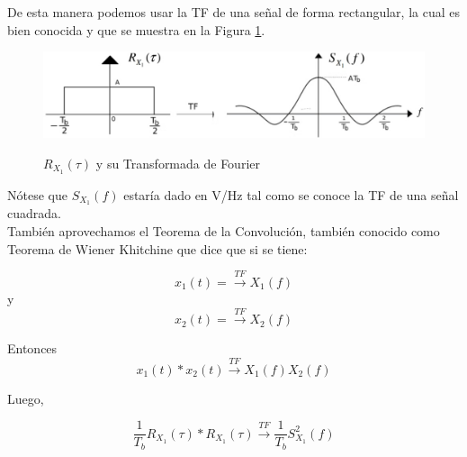 De esta manera podemos usar la TF de una señal de forma rectangular, la cual es bien conocida y que se muestra en la Figura \ref{fig:Cuadrado-dos}.

\begin{figure}[h!]
	\captionsetup{justification = raggedright, singlelinecheck = false}
	\caption{$R_{X_1}(\tau)$ y su Transformada de Fourier} 
	\centering
	\includegraphics[scale=0.6]{Imagenes/Cuadrado-dos.png}
	\label{fig:Cuadrado-dos}
\end{figure}

Nótese que $S_{X_1}(f)$ estaría dado en V/Hz tal como se conoce la TF de una señal cuadrada. \\
También aprovechamos el Teorema de la Convolución, también conocido como Teorema de Wiener Khitchine que dice que si se tiene:

\begin{equation} \label{equ_treintaseis}
	x_{1}(t) = \overset{TF}{\rightarrow} X_{1}(f) 
\end{equation}
y
\begin{equation} \label{equ_treintasietex}
	x_{2}(t) = \overset{TF}{\rightarrow} X_{2}(f)
\end{equation}

Entonces
\begin{equation} \label{equ_treintasiete}
	 x_{1}(t) * x_{2}(t) \overset{TF}{\rightarrow} X_{1}(f) X_{2}(f)
\end{equation}

Luego,

\begin{equation} \label{equ_treintaocho}
\frac{1}{T_b}R_{X_1}(\tau )*R_{X_1}(\tau )\overset{TF}{\rightarrow}\frac{1}{T_b}S^{2}_{X_{1}}(f)
\end{equation}

